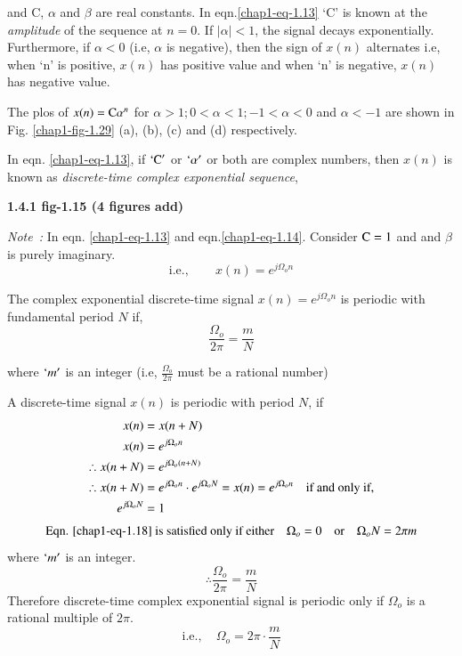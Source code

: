 and C, $\alpha$ and $\beta$ are real constants. In eqn.\ref{chap1-eq-1.13} `C' is known at the \textit{amplitude} of the sequence at $n=0$. If $|\alpha| < 1$, the signal decays exponentially. Furthermore, if $\alpha < 0$ (i.e, $\alpha$ is negative), then the sign of $x(n)$ alternates i.e, when `n' is positive, $x(n)$ has positive value and when `n' is negative, $x(n)$ has negative value.

The plos of $x(n) = \textrm{C} \alpha^{n}$ for $\alpha > 1; 0< \alpha < 1 ; -1 < \alpha < 0$ and $\alpha < -1$  are shown in Fig. \ref{chap1-fig-1.29} (a), (b), (c) and (d) respectively.

In eqn. \ref{chap1-eq-1.13}, if $`\textrm{C}'$ or $`\alpha'$ or both are complex numbers, then $x(n)$ is known as \textit{discrete-time complex exponential sequence},

\begin{center}
{\bf 1.4.1 fig-1.15  (4 figures add)}
\end{center}

\noindent
\textit{Note~:} In eqn. \ref{chap1-eq-1.13} and eqn.\ref{chap1-eq-1.14}. Consider $\textrm{C}=1$ and and $\beta$ is purely imaginary.
\begin{equation}
\text{i.e.}, \qquad  x(n)= e^{j\Omega_{o}n}\label{chap1-eq-1.15}
\end{equation} 

The complex exponential discrete-time signal $x(n)= e^{j\Omega_{o}n}$  is periodic with fundamental period $N$ if,
\begin{equation}
\dfrac{\Omega_{o}}{2 \pi} = \dfrac{m}{N}\label{chap1-eq-1.16}
\end{equation}

where $`m'$  is an integer (i.e, $\frac{\Omega_{o}}{2\pi}$ must be a rational number)

A discrete-time signal $x(n)$ is periodic with period $N$, if
\begin{align}
x(n) &= x(n + N)\notag\\
x(n) &= e^{j \Omega_{o}n}\notag\\
\therefore x(n + N)&= e^{j \Omega_{o}(n + N)}\label{chap1-eq-1.17}\\ 
\therefore x(n + N)&= e^{j \Omega_{o}n} \cdot e^{j \Omega_{o} N}=x(n)= e^{j \Omega_{o}n} \quad \text{if and only if},\notag\\
e^{j \Omega_{o} N} &= 1\label{chap1-eq-1.18}
\end{align}
\begin{equation}
\text{Eqn. \ref{chap1-eq-1.18} is satisfied  only if either} \quad \Omega_{o} = 0\quad \text{or} \quad
\Omega_{o}N= 2\pi m\label{chap1-eq-1.19}
\end{equation}
where $`m'$ is an integer.
\begin{equation}
\therefore \dfrac{\Omega_{o}}{2 \pi}  = \dfrac{m}{N}\label{chap1-eq-1.20}
\end{equation}
Therefore discrete-time complex exponential signal is periodic only if $\Omega_{o}$ is a rational multiple of $2\pi$.
\begin{equation}
\text{i.e.},  \quad \Omega_{o} = 2\pi \cdot \dfrac{m}{N}\label{chap1-eq-1.21}
\end{equation}

